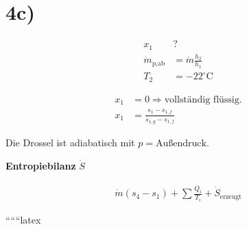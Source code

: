

\section*{4c)}

\begin{align*}
x_1 & \text{?} \\
\dot{m}_{\text{p,ab}} & = \dot{m} \frac{h_2}{h_1} \\
T_2 & = -22^\circ \text{C}
\end{align*}

\begin{align*}
x_1 & = 0 \Rightarrow \text{vollständig flüssig.} \\
x_1 & = \frac{s_1 - s_{1,f}}{s_{1,g} - s_{1,f}}
\end{align*}

Die Drossel ist adiabatisch mit \( p = \text{Außendruck} \).

\textbf{Entropiebilanz} \( \dot{S} \)

\begin{align*}
\dot{m} (s_4 - s_1) + \sum \frac{\dot{Q}_i}{T_i} + \dot{S}_{\text{erzeugt}}
\end{align*}

``````latex
